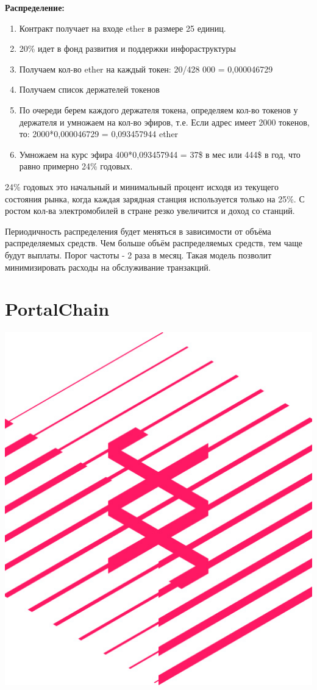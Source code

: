 \documentclass[a4paper,12pt]{report}
\begin{document}
\textbf{Распределение:}

\begin{enumerate}
	\item Контракт получает на входе ether в размере 25 единиц.
	\item 20\% идет в фонд развития и поддержки инфораструктуры
	\item Получаем кол-во ether на каждый токен: 20/428 000 = 0,000046729
	\item Получаем список держателей токенов
	\item По очереди берем каждого держателя токена, определяем кол-во токенов у держателя и умножаем на кол-во эфиров, т.е. Если адрес имеет 2000 токенов, то: 2000*0,000046729 = 0,093457944 ether
	\item Умножаем на курс эфира 400*0,093457944 = 37\$ в мес или 444\$ в год, что равно примерно 24\% годовых. 
\end{enumerate}

24\% годовых это начальный и минимальный процент исходя из текущего состояния рынка, когда каждая зарядная станция используется только на 25\%. С ростом кол-ва электромобилей в стране резко увеличится и доход со станций.  

Периодичность распределения будет меняться в зависимости от объёма распределяемых средств. Чем больше объём распределяемых средств, тем чаще будут выплаты. Порог частоты - 2 раза в месяц. Такая модель позволит минимизировать расходы на обслуживание транзакций.


\section{PortalChain}

\vspace*{0.5cm}
\includegraphics[width=13.6cm]{substrate-logo}
\vspace*{0.5cm}
\end{document}
